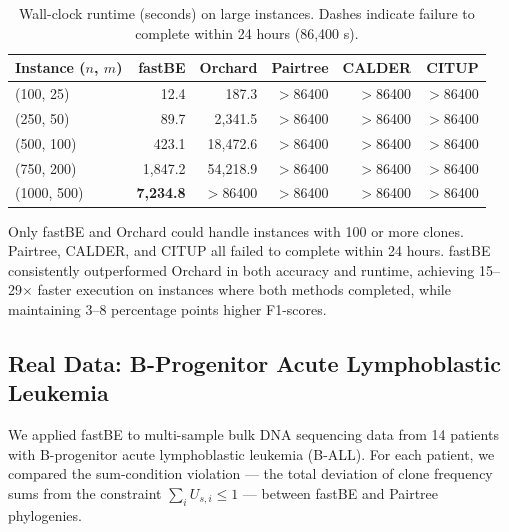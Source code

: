 \documentclass[11pt]{article}
\begin{document}
\begin{table}[H]
\centering
\caption{Wall-clock runtime (seconds) on large instances. Dashes indicate failure to complete within 24 hours (86,400 s).}
\label{tab:runtime_large}
\begin{tabular}{lrrrrr}
\toprule
\textbf{Instance} ($n$, $m$) & \textbf{fastBE} & \textbf{Orchard} & \textbf{Pairtree} & \textbf{CALDER} & \textbf{CITUP} \\
\midrule
(100, 25) & 12.4 & 187.3 & $>$86400 & $>$86400 & $>$86400 \\
(250, 50) & 89.7 & 2,341.5 & $>$86400 & $>$86400 & $>$86400 \\
(500, 100) & 423.1 & 18,472.6 & $>$86400 & $>$86400 & $>$86400 \\
(750, 200) & 1,847.2 & 54,218.9 & $>$86400 & $>$86400 & $>$86400 \\
(1000, 500) & \textbf{7,234.8} & $>$86400 & $>$86400 & $>$86400 & $>$86400 \\
\bottomrule
\end{tabular}
\end{table}

Only fastBE and Orchard could handle instances with 100 or more clones. Pairtree, CALDER, and CITUP all failed to complete within 24 hours. fastBE consistently outperformed Orchard in both accuracy and runtime, achieving 15--29$\times$ faster execution on instances where both methods completed, while maintaining 3--8 percentage points higher F1-scores.

\subsection{Real Data: B-Progenitor Acute Lymphoblastic Leukemia}

We applied fastBE to multi-sample bulk DNA sequencing data from 14 patients with B-progenitor acute lymphoblastic leukemia (B-ALL). For each patient, we compared the sum-condition violation --- the total deviation of clone frequency sums from the constraint $\sum_i U_{s,i} \leq 1$ --- between fastBE and Pairtree phylogenies.
\end{document}
